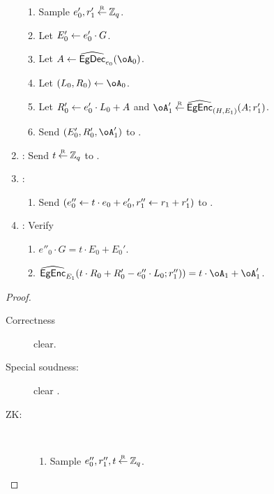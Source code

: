 \begin{description}
\begin{protocol}
\begin{enumerate}
\begin{enumerate}
				
				\item Sample $e'_0,r'_1\mathbin{\stackrel{\mbox{\tiny R}}{\leftarrow}}  {\mathbb Z}_q$.
				
				\item Let $E'_0 \leftarrow e'_0 \cdot G$.
				
				\item Let $A\asn \wEgDec_{e_0}(\oA_0)$.
				
				\item Let $(L_0,R_0) \asn \oA_0$.
				
				\item Let $R'_0 \leftarrow e_0' \cdot L_0  +A$ and $\oA_1' \getsr \wEgEnc_{(H,E_1)}(A;r'_1)$.
				
				\item Send $(E'_0,R_0',\oA_1')$ to \Vc.
			\end{enumerate}
			
			\item \Vc: Send $t\mathbin{\stackrel{\mbox{\tiny R}}{\leftarrow}} {\mathbb Z}_q$ to \Pc.
			
			\item \Pc: 
			\begin{enumerate}
			
				
				\item Send $(e''_0 \leftarrow t\cdot e_0 + e_0',r''_1 \leftarrow r_1 + r_1')$ to \Vc. 
			\end{enumerate}
		
		\item \Vc: Verify  
		
			\begin{enumerate}
			\item $e''_0\cdot G = t\cdot E_0 + E_0'$.
			
			\item  $\wEgEnc_{E_1}(t\cdot R_0 + R_0' - e''_0 \cdot L_0;r_1'')) = t\cdot \oA_1 + \oA_1'$.
		\end{enumerate}
		\end{enumerate}
		
		
	\end{protocol}
	
	\begin{proof}
	\begin{description}
		\item[Correctness] clear.
		
		
		\item[Special soudness:] clear .
		
		\item[ZK:]~ 
		\begin{enumerate}
			\item Sample $e_0'',r_1'',t\mathbin{\stackrel{\mbox{\tiny R}}{\leftarrow}} {\mathbb Z}_q$.
			

\end{enumerate}
\end{description}
\end{proof}
\end{description}

